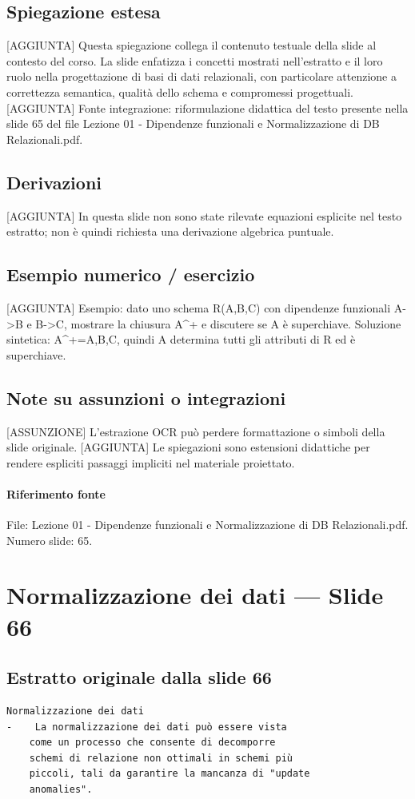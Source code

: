 \documentclass[11pt]{article}
\begin{document}
\subsection*{Spiegazione estesa}
[AGGIUNTA] Questa spiegazione collega il contenuto testuale della slide al contesto del corso. La slide enfatizza i concetti mostrati nell'estratto e il loro ruolo nella progettazione di basi di dati relazionali, con particolare attenzione a correttezza semantica, qualità dello schema e compromessi progettuali.
[AGGIUNTA] Fonte integrazione: riformulazione didattica del testo presente nella slide 65 del file Lezione 01 - Dipendenze funzionali e Normalizzazione di DB Relazionali.pdf.
\subsection*{Derivazioni}
[AGGIUNTA] In questa slide non sono state rilevate equazioni esplicite nel testo estratto; non è quindi richiesta una derivazione algebrica puntuale.
\subsection*{Esempio numerico / esercizio}
[AGGIUNTA] Esempio: dato uno schema R(A,B,C) con dipendenze funzionali A->B e B->C, mostrare la chiusura A^+ e discutere se A è superchiave. Soluzione sintetica: A^+={A,B,C}, quindi A determina tutti gli attributi di R ed è superchiave.
\subsection*{Note su assunzioni o integrazioni}
[ASSUNZIONE] L'estrazione OCR può perdere formattazione o simboli della slide originale.
[AGGIUNTA] Le spiegazioni sono estensioni didattiche per rendere espliciti passaggi impliciti nel materiale proiettato.
\paragraph{Riferimento fonte} File: Lezione 01 - Dipendenze funzionali e Normalizzazione di DB Relazionali.pdf. Numero slide: 65.
\section{Normalizzazione dei dati --- Slide 66}
\subsection*{Estratto originale dalla slide 66}
\begin{lstlisting}
Normalizzazione dei dati
-    La normalizzazione dei dati può essere vista
    come un processo che consente di decomporre
    schemi di relazione non ottimali in schemi più
    piccoli, tali da garantire la mancanza di "update
    anomalies".
\end{lstlisting}
\end{document}
